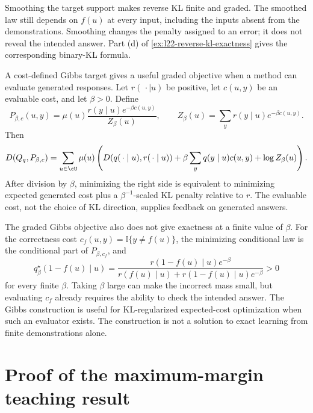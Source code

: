 \documentclass[11pt,twoside]{article}
\newcommand{\I}{\mathbb I}
\newcommand{\KL}{D}
\theoremstyle{definition}
\theoremstyle{remark}
\begin{document}
Smoothing the target support makes reverse KL finite and graded. The smoothed
law still depends on \(f(u)\) at every input, including the inputs absent from
the demonstrations. Smoothing changes the penalty assigned to an error; it
does not reveal the intended answer. Part (d) of
\cref{ex:l22-reverse-kl-exactness} gives the corresponding binary-KL formula.

A cost-defined Gibbs target gives a useful graded objective when a method can
evaluate generated responses. Let \(r(\,\cdot\mid u)\) be positive, let
\(c(u,y)\) be an evaluable cost, and let \(\beta>0\). Define
\begin{equation}
 P_{\beta,c}(u,y)
 =\mu(u)\frac{r(y\mid u)e^{-\beta c(u,y)}}{Z_\beta(u)},
 \qquad
 Z_\beta(u)=\sum_y r(y\mid u)e^{-\beta c(u,y)}.
 \label{eq:appendix-gibbs-target}
\end{equation}
Then
\begin{equation}
 \KL(Q_q,P_{\beta,c})
 =\sum_{u\in\cU}\mu(u)\left(
 \KL(q(\,\cdot\mid u),r(\,\cdot\mid u))
 +\beta\sum_y q(y\mid u)c(u,y)+\log Z_\beta(u)\right).
 \label{eq:appendix-gibbs-identity}
\end{equation}
After division by \(\beta\), minimizing the right side is equivalent to
minimizing expected generated cost plus a
\(\beta^{-1}\)-scaled KL penalty relative to \(r\). The evaluable cost, not the
choice of KL direction, supplies feedback on generated answers.

The graded Gibbs objective also does not give exactness at a finite value of
\(\beta\). For the correctness cost
\(c_f(u,y)=\I\{y\ne f(u)\}\), the minimizing conditional law is the conditional
part of \(P_{\beta,c_f}\), and
\begin{equation}
 q_\beta^\star(1-f(u)\mid u)
 =\frac{r(1-f(u)\mid u)e^{-\beta}}
 {r(f(u)\mid u)+r(1-f(u)\mid u)e^{-\beta}}>0
 \label{eq:appendix-gibbs-not-exact}
\end{equation}
for every finite \(\beta\). Taking \(\beta\) large can make the incorrect mass
small, but evaluating \(c_f\) already requires the ability to check the
intended answer. The Gibbs construction is useful for KL-regularized
expected-cost optimization when such an evaluator exists. The construction is
not a solution to exact learning from finite demonstrations alone.

\section{Proof of the maximum-margin teaching result}
\label{app:max-margin}
\end{document}
